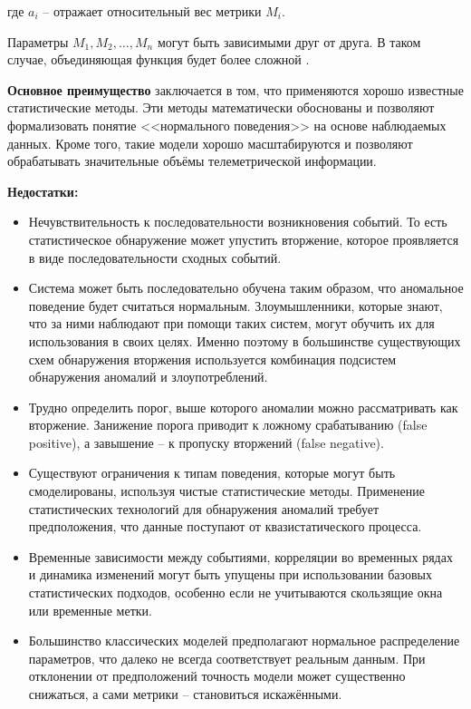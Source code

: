 где $a_i$ -- отражает относительный вес метрики $M_i$.

Параметры $M_1, M_2, \dots, M_n$ могут быть зависимыми друг от друга. В таком случае,
объединяющая функция будет более сложной \autocite{IDSystem}.

\textbf{Основное преимущество} заключается в том, что применяются хорошо известные статистические методы.
Эти методы математически обоснованы и позволяют формализовать понятие <<нормального поведения>> на основе наблюдаемых данных. Кроме того, такие модели хорошо масштабируются и позволяют обрабатывать значительные объёмы телеметрической информации.

\textbf{Недостатки:}
\begin{itemize}
	\item Нечувствительность к последовательности возникновения событий.
	То есть статистическое обнаружение может упустить вторжение,
	которое проявляется в виде последовательности сходных событий.
	
	\item Система может быть последовательно обучена таким образом, что аномальное поведение
	будет считаться нормальным. Злоумышленники, которые знают, что за ними наблюдают
	при помощи таких систем, могут обучить их для использования в своих целях. Именно поэтому в
	большинстве существующих схем обнаружения вторжения используется комбинация подсистем
	обнаружения аномалий и злоупотреблений.

	\item Трудно определить порог, выше которого аномалии можно рассматривать как вторжение.
	Занижение порога приводит к ложному срабатыванию (false positive), а завышение -- к пропуску вторжений (false negative).

	\item Существуют ограничения к типам поведения, которые могут быть смоделированы,
	используя чистые статистические методы. Применение статистических технологий для
	обнаружения аномалий требует предположения, что данные поступают от квазистатического процесса.

	\item Временные зависимости между событиями, корреляции во временных рядах и динамика изменений
	могут быть упущены при использовании базовых статистических подходов, особенно если не учитываются скользящие окна или временные метки.

	\item Большинство классических моделей предполагают нормальное распределение параметров,
	что далеко не всегда соответствует реальным данным. При отклонении от предположений
	точность модели может существенно снижаться, а сами метрики -- становиться искажёнными.
\end{itemize}

